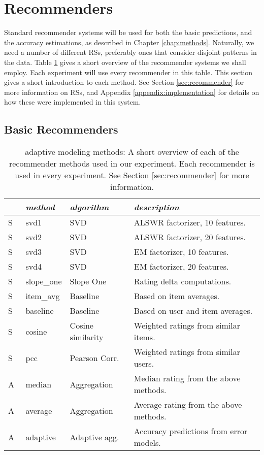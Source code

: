 \section{Recommenders}

Standard recommender systems will be used for both the basic predictions, and the accuracy estimations, as described in Chapter \ref{chap:methods}.
Naturally, we need a number of different RSs, preferably ones that consider
disjoint patterns in the data. Table \ref{table:results:methods}
gives a short overview of the recommender systems we shall employ.
Each experiment will use every recommender in this table.
This section gives a short introduction to each method.
See Section \ref{sec:recommender} for more information on RSs, 
and Appendix \ref{appendix:implementation} for details on how these were implemented in this system.


\subsection{Basic Recommenders}

\begin{table}[t]
  \begin{tabular*}{\textwidth}{ l l l l }
    \toprule
    ~ & \emph{method} &  \emph{algorithm} & \emph{description} \\
    \midrule
    S & svd1          & SVD                   & ALSWR factorizer, 10 features. \\
    S & svd2          & SVD                   & ALSWR factorizer, 20 features. \\
    S & svd3          & SVD                   & EM factorizer, 10 features. \\
    S & svd4          & SVD                   & EM factorizer, 20 features. \\
    S & slope\_one    & Slope One             & Rating delta computations. \\
    S & item\_avg     & Baseline              & Based on item averages. \\ 
    S & baseline      & Baseline              & Based on user and item averages.\\ 
    S & cosine   	    & Cosine similarity     & Weighted ratings from similar items.\\ 
    S & pcc       	  & Pearson Corr.         & Weighted ratings from similar users.\\
    \midrule
    A & median    	  & Aggregation           & Median rating from the above methods. \\
    A & average    	  & Aggregation           & Average rating from the above methods. \\
    A & adaptive      & Adaptive agg.         & Accuracy predictions from error models. \\
    \bottomrule
  \end{tabular*}
  \caption[adaptive Modeling Methods]{
    adaptive modeling methods: A short overview of each of the recommender methods
    used in our experiment.
    Each recommender is used in every experiment. 
    See Section \ref{sec:recommender} for more information.
  }
  \label{table:results:methods}
\end{table}

